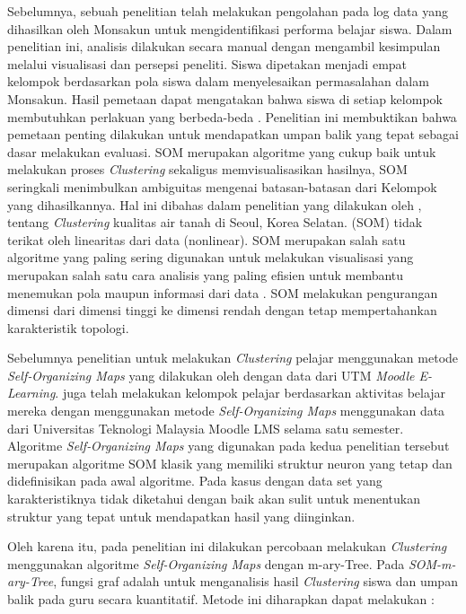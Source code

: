 Sebelumnya, sebuah penelitian telah melakukan pengolahan pada log data yang dihasilkan oleh Monsakun untuk mengidentifikasi performa belajar siswa. Dalam penelitian ini, analisis dilakukan secara manual dengan mengambil kesimpulan melalui visualisasi dan persepsi peneliti. Siswa dipetakan menjadi empat kelompok berdasarkan pola siswa dalam menyelesaikan permasalahan dalam Monsakun. Hasil pemetaan dapat mengatakan bahwa siswa di setiap kelompok membutuhkan perlakuan yang berbeda-beda \cite{SupiantoHayashiHirashima2019}.  Penelitian  ini  membuktikan  bahwa  pemetaan penting dilakukan untuk mendapatkan umpan balik yang tepat sebagai dasar melakukan evaluasi. SOM merupakan algoritme yang cukup baik untuk melakukan proses \textit{Clustering} sekaligus memvisualisasikan hasilnya, SOM seringkali menimbulkan ambiguitas     mengenai     batasan-batasan     dari     Kelompok     yang dihasilkannya. Hal ini dibahas dalam penelitian yang dilakukan oleh \cite{Lee2019}, tentang \textit{Clustering} kualitas air tanah di Seoul, Korea Selatan. (SOM) tidak terikat oleh linearitas dari data (nonlinear). SOM merupakan salah satu algoritme yang paling sering digunakan untuk melakukan visualisasi yang merupakan salah satu cara analisis yang paling efisien untuk membantu menemukan pola maupun informasi dari data \cite{Kreuseler2002}. SOM melakukan pengurangan dimensi dari dimensi tinggi ke dimensi rendah dengan tetap mempertahankan karakteristik topologi. 

Sebelumnya penelitian untuk melakukan \textit{Clustering} pelajar menggunakan metode \textit{Self‐Organizing Maps} yang dilakukan oleh \cite{Ahmad2018} dengan data dari UTM \textit{Moodle E-Learning}. \cite{Bara2018} juga telah melakukan kelompok pelajar berdasarkan aktivitas belajar mereka dengan menggunakan metode \textit{Self-Organizing Maps} menggunakan data dari Universitas Teknologi Malaysia Moodle LMS selama satu semester. Algoritme \textit{Self‐Organizing Maps} yang digunakan pada kedua penelitian tersebut merupakan algoritme SOM klasik yang memiliki struktur neuron yang tetap dan didefinisikan pada awal algoritme. Pada kasus dengan data set yang karakteristiknya tidak diketahui dengan baik akan sulit untuk menentukan struktur yang tepat untuk mendapatkan hasil yang diinginkan.

Oleh karena itu, pada penelitian ini dilakukan percobaan melakukan \textit{Clustering} menggunakan algoritme \textit{Self-Organizing Maps} dengan m-ary-Tree. Pada \textit{SOM-m-ary-Tree}, fungsi graf adalah untuk menganalisis hasil \textit{Clustering} siswa dan umpan balik pada guru secara kuantitatif. Metode ini diharapkan dapat melakukan :

